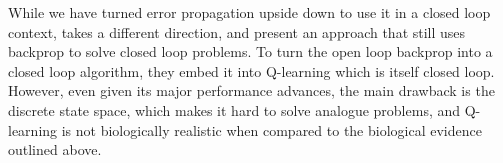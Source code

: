 \documentclass{article}
\begin{document}
While we have turned error propagation upside down to use it in a
closed loop context, \cite{Guo2014} takes a different direction, and
present an approach that still uses backprop to solve closed loop
problems. To turn the open loop backprop into a closed loop algorithm,
they embed it into Q-learning which is itself closed loop. However,
even given its major performance advances, the main drawback is the
discrete state space, which makes it hard to solve analogue problems,
and Q-learning is not biologically realistic when compared to the
biological evidence outlined above.




\end{document}
